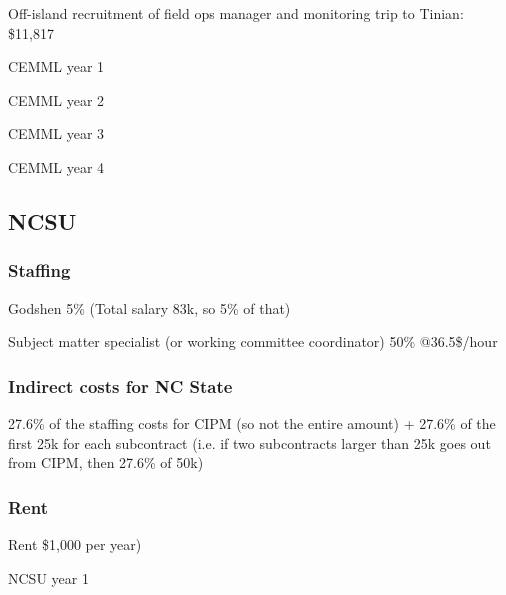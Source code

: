 \documentclass[11pt,english,letterpaper]{scrartcl}
\begin{document}
Off-island recruitment of field ops manager and monitoring trip to Tinian: \$11,817


\begin{table}[h]
	\centering
	\caption{CEMML year 1}	
	
\end{table}

\begin{table}[h]
	\centering
	\caption{CEMML year 2}	
	
\end{table}

\begin{table}[h]
	\centering
	\caption{CEMML year 3}	
	
\end{table}

\begin{table}[h]
	\centering
	\caption{CEMML year 4}	
	
\end{table}

\clearpage

\subsection{NCSU}

\subsubsection{Staffing}

Godshen 5\% (Total salary 83k, so 5\% of that)

Subject matter specialist (or working committee coordinator) 50\% @36.5\$/hour

\subsubsection{Indirect costs for NC State}

27.6\% of the staffing costs for CIPM (so not the entire amount) + 27.6\% of the first 25k for each subcontract (i.e. if two subcontracts larger than 25k goes out from CIPM, then 27.6\% of 50k)

\subsubsection{Rent}

Rent \$1,000 per year)


\begin{table}[h]
	\centering
	\caption{NCSU year 1}	
	
\end{table}
\end{document}
